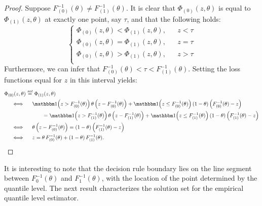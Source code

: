 \begin{proof}
  Suppose $F_{(0)}^{-1}(\theta) \ne F_{(1)}^{-1}(\theta)$.  It is clear that
  $\Phi_{(0)}(z, \theta)$ is equal to $\Phi_{(1)}(z, \theta)$ at exactly one
  point, say $\tau$, and that the following holds:
  \begin{equation*}
    \left\{
      \begin{array}{lll}
        \Phi_{(0)}(z, \theta) < \Phi_{(1)}(z, \theta), & & z < \tau \\[1ex]
        \Phi_{(0)}(z, \theta) = \Phi_{(1)}(z, \theta), & & z = \tau \\[1ex]
        \Phi_{(0)}(z, \theta) > \Phi_{(1)}(z, \theta), & & z > \tau \\
      \end{array}
    \right.
  \end{equation*}
  Furthermore, we can infer that
  $F_{(0)}^{-1}(\theta) < \tau < F_{(1)}^{-1}(\theta)$.  Setting the loss
  functions equal for $z$ in this interval yields:
  \begin{align*}
    & \Phi_{(0)}(z, \theta) \stackrel{\mathit{set}}{=} \Phi_{(1)}(z, \theta) \\
    & \hspace{5mm} \Longleftrightarrow \hspace{5mm}
      \ind\!\! \left(z > F_{(0)}^{-1}(\theta)\right) \theta
      \left(z - F_{(0)}^{-1}(\theta)\right) +
      \ind\!\! \left(z \leq F_{(0)}^{-1}(\theta)\right) (1 - \theta)
      \left(F_{(0)}^{-1}(\theta) - z\right) \\
    & \hspace{25mm} =
      \ind\!\! \left(z > F_{(1)}^{-1}(\theta)\right) \theta
      \left(z - F_{(1)}^{-1}(\theta)\right) +
      \ind\!\! \left(z \leq F_{(1)}^{-1}(\theta)\right) (1 - \theta)
      \left(F_{(1)}^{-1}(\theta) - z\right) \\
    & \hspace{5mm} \Longleftrightarrow \hspace{5mm}
      \theta \left(z - F_{(0)}^{-1}(\theta)\right) =
      (1 - \theta) \left(F_{(1)}^{-1}(\theta) - z\right) \\
    & \hspace{5mm} \Longleftrightarrow \hspace{5mm}
      z = \theta\, F_{(0)}^{-1}(\theta) + (1 - \theta)\, F_{(1)}^{-1}(\theta).
  \end{align*}
\end{proof}
It is interesting to note that the decision rule boundary lies on the line
segment between $F_0^{-1}(\theta)$ and $F_1^{-1}(\theta)$, with the location of
the point determined by the quantile level.  The next result characterizes the
solution set for the empirical quantile level estimator.

